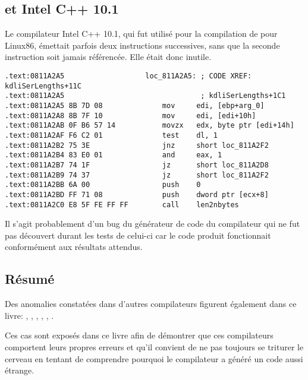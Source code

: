 ﻿
\label{anomaly:Intel}
\myindex{\CompilerAnomaly}

\subsection{ et Intel C++ 10.1}

\myindex{\oracle}

Le compilateur Intel C++ 10.1, qui fut utilisé pour la compilation de  pour Linux86, 
émettait parfois deux instructions \JZ successives, sans que la seconde instruction soit jamais 
référencée. Elle était donc inutile.



\begin{lstlisting}[caption=from the same code,style=customasmx86]
.text:0811A2A5                   loc_811A2A5: ; CODE XREF: kdliSerLengths+11C
.text:0811A2A5                                ; kdliSerLengths+1C1
.text:0811A2A5 8B 7D 08              mov     edi, [ebp+arg_0]
.text:0811A2A8 8B 7F 10              mov     edi, [edi+10h]
.text:0811A2AB 0F B6 57 14           movzx   edx, byte ptr [edi+14h]
.text:0811A2AF F6 C2 01              test    dl, 1
.text:0811A2B2 75 3E                 jnz     short loc_811A2F2
.text:0811A2B4 83 E0 01              and     eax, 1
.text:0811A2B7 74 1F                 jz      short loc_811A2D8
.text:0811A2B9 74 37                 jz      short loc_811A2F2
.text:0811A2BB 6A 00                 push    0
.text:0811A2BD FF 71 08              push    dword ptr [ecx+8]
.text:0811A2C0 E8 5F FE FF FF        call    len2nbytes
\end{lstlisting}

Il s'agit probablement d'un bug du générateur de code du compilateur qui ne fut pas découvert durant 
les tests de celui-ci car le code produit fonctionnait conformément aux résultats attendus.



\subsection{Résumé}

Des anomalies constatées dans d'autres compilateurs figurent également dans ce livre: 
, , ,
,
,
.

Ces cas sont exposés dans ce livre afin de démontrer que ces compilateurs comportent leurs propres 
erreurs et qu'il convient de ne pas toujours se triturer le cerveau en tentant de comprendre 
pourquoi le compilateur a généré un code aussi étrange.

